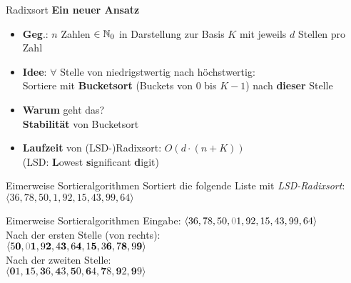 \begin{frame}{Radixsort}
	\textbf{Ein neuer Ansatz} \\
	\begin{itemize}
		\item \textbf{Geg}.: $n$ Zahlen $\in \mathbb{N}_0$  in Darstellung zur Basis $K$ mit jeweils $d$ Stellen pro Zahl 
		\pause
		\item \textbf{Idee}: $\forall $ Stelle von niedrigstwertig nach höchstwertig: \\ Sortiere mit \textbf{Bucketsort} (Buckets von $0$ bis $K-1$) nach \textbf{dieser} Stelle
		\pause
		\item \textbf{Warum} geht das? \\
		\pause 
		\impl \textbf{Stabilität} von Bucketsort
		\item \textbf{Laufzeit} von (LSD-)Radixsort: $O(d \cdot (n + K))$ \\
		{\small (LSD: \textbf{L}owest \textbf{s}ignificant \textbf{d}igit)}
	\end{itemize}
\end{frame}

\begin{frame}{Eimerweise Sortieralgorithmen}
	Sortiert die folgende Liste mit \emph{LSD-Radixsort}:  $\langle 36, 78, 50, 1, 92, 15, 43, 99, 64 \rangle$
\end{frame}

\begin{frame}{Eimerweise Sortieralgorithmen}
	\solutionheading \medskip
	Eingabe:  $\langle 36, 78, 50, \gray{0}1, 92, 15, 43, 99, 64 \rangle$
	\\[0,25cm]
	Nach der ersten Stelle (von rechts): \\ $\langle 5\textbf{0}, \gray{0}\textbf{1}, 9\textbf{2}, 4\textbf{3}, 6\textbf{4}, 1\textbf{5}, 3\textbf{6}, 7\textbf{8}, 9\textbf{9} \rangle$
	\\[0,25cm]
	Nach der zweiten Stelle: \\ $\langle \textbf{0}1, \textbf{1}5, \textbf{3}6, \textbf{4}3, \textbf{5}0, \textbf{6}4, \textbf{7}8, \textbf{9}2, \textbf{9}9 \rangle$
\end{frame}

